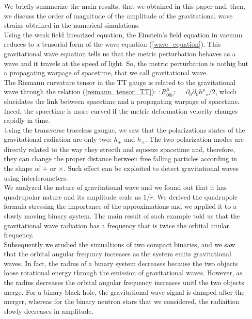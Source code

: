 We briefly summerize the main results, that we obtained in this paper and, then, we discuss the order of magnitude of the amplitude of the gravitational wave strains obtained in the numerical simulations.\\
Using the weak field linearized equation, the Einstein's field equation in vacuum reduces to a tensorial form of the wave equation (\ref{wave_equation}).
This gravitational wave equation tells us that the metric perturbation behaves as a wave and it travels at the speed of light.
So, the metric perturbation is nothig but a propagating warpage of spacetime, that we call gravitational wave.\\
The Riemann curvature tensor in the TT gauge is related to the gravitational wave through the relation (\ref{reimann_tensor_TT}): $:R^{\mu} _{00 \nu}: = \partial_0 \partial_0 h^{\mu}\! _{\nu}/2$, which elucidates the link between spacetime and a propagating warpage of spacetime. Ineed,
the spacetime is more curved if the metric deformation velocity changes rapidly in time.\\
Using the transverse traceless gaugue, we saw that the polarizations states of the gravitational radiation are only two: $h_{+}$ and $h_{\times}$.
The two polarization modes are directly related to the way they strecth and squeeze spacetime and, therefore, they can change the proper distance between free falling particles according in the shape of $+$ or $\times$.
Such effect can be exploited to detect gravitational waves using interferometers.\\
We analyzed the nature of gravitational wave  and we found out that it has quadrupolar nature and its amplitude scale as $1/r$.
We derived the quadrupole formula stressing the importance of the approximations and we applied it to a slowly moving binary system.
The main result of such example told us that the gravitational wave radiation has a frequency that is twice the orbital anular frequency.\\
Subsequently we studied the simualtions of two compact binaries, and we saw that the orbital angular frequncy increases as the system emits gravitational waves.
In fact, the radius of a binary system decreases because the two objects loose rotational energy through the emission of gravitational waves. However, as the radius decreases the orbital angular frequency increases unitl the two objects merge.
For a binary black hole, the gravitational wave signal is damped after the merger, whereas for the binary neutron stars that we considered, the radiaition slowly decreases in amplitude. \\
